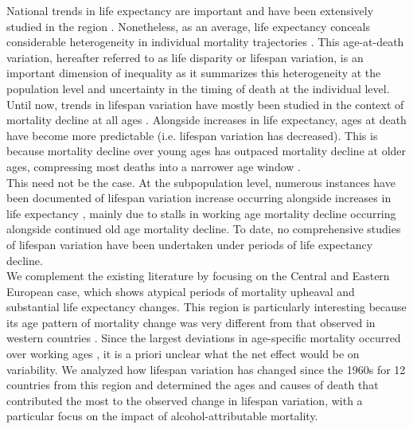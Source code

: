 \documentclass{article}
\begin{document}
\begin{spacing}{1.5}
National trends in life expectancy are important and have been extensively studied in the region \citep{mesle2004mortality, mesle2000, rychtarikova2004,shkolnikov2001,shkolnikov2006changing,leon2011}. Nonetheless, as an average, life expectancy conceals considerable heterogeneity in individual mortality trajectories \citep{edwards2005, wilmoth1999}. This age-at-death variation, hereafter referred to as life disparity or lifespan variation, is an important dimension of inequality as it summarizes this heterogeneity at the population level and uncertainty in the timing of death at the individual level. Until now, trends in lifespan variation have mostly been studied in the context of mortality decline at all ages \citep{edwards2005,smits2009,vaupel2011}. Alongside increases in life expectancy, ages at death have become more predictable (i.e. lifespan variation has decreased). This is because mortality decline over young ages has outpaced mortality decline at older ages, compressing most deaths into a narrower age window \citep{vaupel2011}.\\

This need not be the case. At the subpopulation level, numerous instances have been documented of lifespan variation increase occurring alongside increases in life expectancy \citep{vanraalte2014,sasson2016trends,seaman2016increasing, bronnum-hansen2017}, mainly due to stalls in working age mortality decline occurring alongside continued old age mortality decline. To date, no comprehensive studies of lifespan variation have been undertaken under periods of life expectancy decline.\\

We complement the existing literature by focusing on the Central and Eastern European case, which shows atypical periods of mortality upheaval and substantial life expectancy changes. This region is particularly interesting because its age pattern of mortality change was very different from that observed in western countries \citep{mesle2004mortality}. Since the largest deviations in age-specific mortality occurred over working ages \citep{rehm2007}, it is a priori unclear what the net effect would be on variability. We analyzed how lifespan variation has changed since the 1960s for 12 countries from this region and determined the ages and causes of death that contributed the most to the observed change in lifespan variation, with a particular focus on the impact of alcohol-attributable mortality. 
%



\end{spacing}
\end{document}
